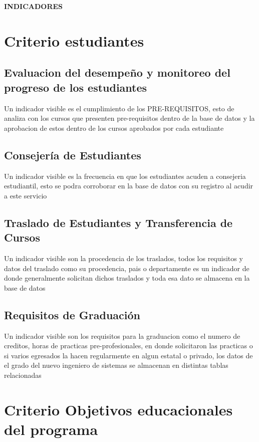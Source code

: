 \documentclass[12pt,a4paper]{report}
\begin{document}


\tableofcontents
\newpage

\begin{Large}
\textbf{INDICADORES} \\
\end{Large}
\section{Criterio estudiantes}

\subsection{Evaluacion del desempeño y monitoreo del progreso de los estudiantes}
Un indicador visible es el cumplimiento de los PRE-REQUISITOS, esto de analiza con los cursos que presenten pre-requisitos dentro de la base de datos y la aprobacion de estos dentro de los cursos aprobados por cada estudiante
\subsection{Consejería de Estudiantes}
Un indicador visible es la frecuencia en que los estudiantes acuden a consejeria estudiantil, esto se podra corroborar en la base de datos con su registro al acudir a este servicio
\subsection{Traslado de Estudiantes y Transferencia de Cursos}
Un indicador visible son la procedencia de los traslados, todos los requisitos y datos del traslado como su procedencia, pais o departamente es un indicador de donde generalmente solicitan dichos traslados y toda esa dato se almacena en la base de datos
\subsection{Requisitos de Graduación}
Un indicador visible son los requisitos para la graduacion como el numero de creditos, horas de practicas pre-profesionales, en donde solicitaron las practicas o si varios egresados la hacen regularmente en algun estatal o privado, los datos de el grado del nuevo ingeniero de sistemas se almacenan en distintas tablas relacionadas

\section{ Criterio Objetivos educacionales del programa}
\end{document}
